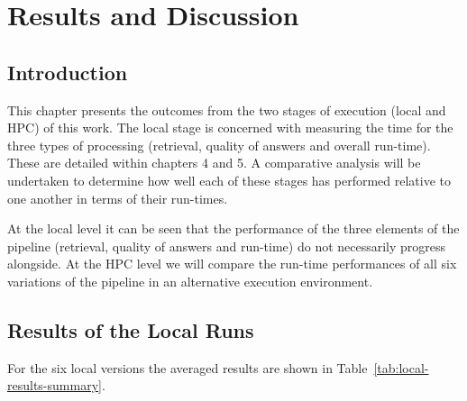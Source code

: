 \chapter{Results and Discussion}

\section{Introduction}

This chapter presents the outcomes from the two stages of execution (local and \ac{HPC}) of this work. The local stage is concerned with measuring the time for the three types of processing (retrieval, quality of answers and overall run-time). These are detailed within chapters 4 and 5. A comparative analysis will be undertaken to determine how well each of these stages has performed relative to one another in terms of their run-times.

At the local level it can be seen that the performance of the three elements of the pipeline (retrieval, quality of answers and run-time) do not necessarily progress alongside. At the \ac{HPC} level we will compare the run-time performances of all six variations of the pipeline in an alternative execution environment.

\section{Results of the Local Runs }

For the six local versions the averaged results are shown in Table~\ref{tab:local-results-summary}.

\begin{table}[htbp]
    \centering
    \caption{Summary of local evaluation results averaged across the five scenarios.}
    \label{tab:local-results-summary}
\end{table}

